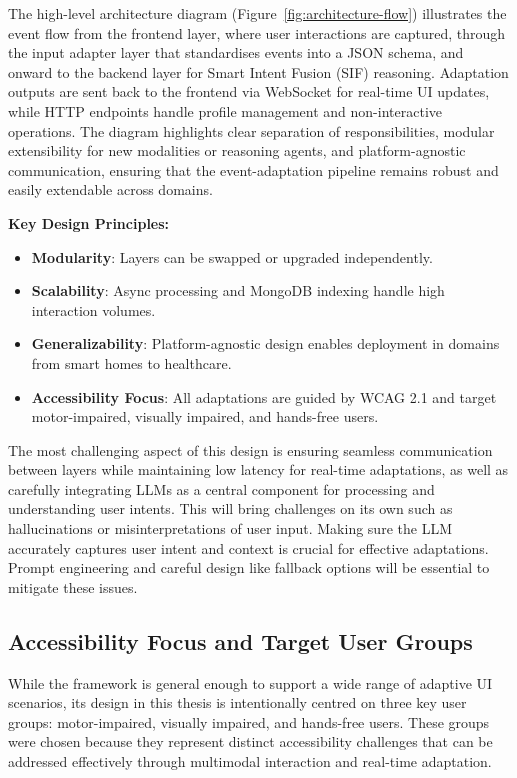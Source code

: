 \documentclass[openany]{book}
\begin{document}
\newpage
The high-level architecture diagram (Figure~\ref{fig:architecture-flow}) illustrates the event flow from the frontend layer, where user interactions are captured, through the input adapter layer that standardises events into a JSON schema, and onward to the backend layer for Smart Intent Fusion (SIF) reasoning. Adaptation outputs are sent back to the frontend via WebSocket for real-time UI updates, while HTTP endpoints handle profile management and non-interactive operations. The diagram highlights clear separation of responsibilities, modular extensibility for new modalities or reasoning agents, and platform-agnostic communication, ensuring that the event-adaptation pipeline remains robust and easily extendable across domains.

\textbf{Key Design Principles:}
\begin{itemize}
\item \textbf{Modularity}: Layers can be swapped or upgraded independently.
\item \textbf{Scalability}: Async processing and MongoDB indexing handle high interaction volumes.
\item \textbf{Generalizability}: Platform-agnostic design enables deployment in domains from smart homes to healthcare.
\item \textbf{Accessibility Focus}: All adaptations are guided by WCAG 2.1 and target motor-impaired, visually impaired, and hands-free users.
\end{itemize}

The most challenging aspect of this design is ensuring seamless communication between layers while maintaining low latency for real-time adaptations, as well as carefully integrating LLMs as a central component for processing and understanding user intents. This will bring challenges on its own such as hallucinations or misinterpretations of user input. Making sure the LLM accurately captures user intent and context is crucial for effective adaptations. Prompt engineering and careful design like fallback options will be essential to mitigate these issues.

\subsection{Accessibility Focus and Target User Groups}
While the framework is general enough to support a wide range of adaptive UI scenarios, its design in this thesis is intentionally centred on three key user groups: motor-impaired, visually impaired, and hands-free users. These groups were chosen because they represent distinct accessibility challenges that can be addressed effectively through multimodal interaction and real-time adaptation.
\end{document}
